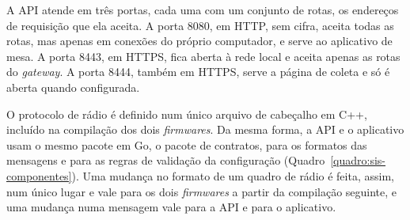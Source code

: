 A API atende em três portas, cada uma com um conjunto de rotas, os endereços de requisição que ela aceita. A porta \num{8080}, em HTTP, sem cifra, aceita todas as rotas, mas apenas em conexões do próprio computador, e serve ao aplicativo de mesa. A porta \num{8443}, em HTTPS, fica aberta à rede local e aceita apenas as rotas do \textit{gateway}. A porta \num{8444}, também em HTTPS, serve a página de coleta e só é aberta quando configurada.

O protocolo de rádio é definido num único arquivo de cabeçalho em C++, incluído na compilação dos dois \textit{firmwares}. Da mesma forma, a API e o aplicativo usam o mesmo pacote em Go, o pacote de contratos, para os formatos das mensagens e para as regras de validação da configuração (Quadro~\ref{quadro:sis-componentes}). Uma mudança no formato de um quadro de rádio é feita, assim, num único lugar e vale para os dois \textit{firmwares} a partir da compilação seguinte, e uma mudança numa mensagem vale para a API e para o aplicativo.

